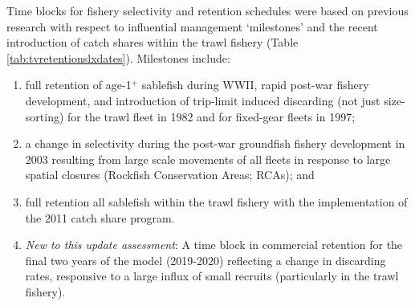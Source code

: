 \documentclass[11pt,
  english,
  a4paper,
]{article}
\begin{document}
\leavevmode\tagmcend\tagstructend\par

Time blocks for fishery selectivity and retention schedules were based on previous research with respect to influential management `milestones' and the recent introduction of catch shares within the trawl fishery (Table \ref{tab:tvretentionslxdates}). Milestones include:

\begin{enumerate}
  \item full retention of age-1$^+$ sablefish during WWII, rapid post-war fishery development, and introduction of trip-limit induced discarding (not just size-sorting) for the trawl fleet in 1982 and for fixed-gear fleets in 1997;
  \item a change in selectivity during the post-war groundfish fishery development in 2003 resulting from large scale movements of all fleets in response to large spatial closures (Rockfish Conservation Areas; RCAs); and
  \item full retention all sablefish within the trawl fishery with the implementation of the 2011 catch share program.
  \item \textit{New to this update assessment}: A time block in commercial retention for the final two years of the model (2019-2020) reflecting a change in discarding rates, responsive to a large influx of small recruits (particularly in the trawl fishery).
\end{enumerate}

\end{document}
